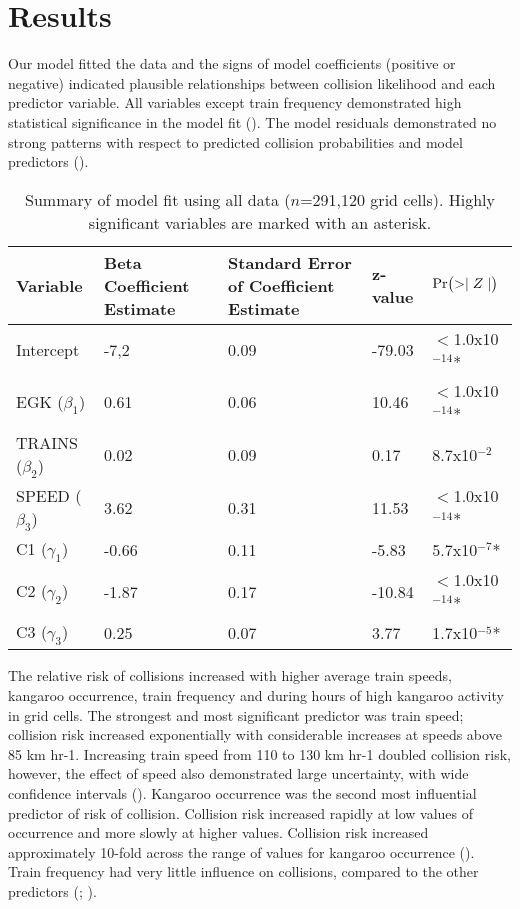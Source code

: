 \section{Results}

Our model fitted the data and the signs of model coefficients (positive or negative) indicated plausible relationships between collision likelihood and each predictor variable.  All variables except train frequency demonstrated high statistical significance in the model fit (). The model residuals demonstrated no strong patterns with respect to predicted collision probabilities and model predictors ().

\begin{table}[htp]
\caption{Summary of model fit using all data ($n$=291,120 grid cells).  Highly significant variables are marked with an asterisk.}
\begin{tabularx}{\textwidth}{lllll} \toprule
Variable			&Beta Coefficient Estimate	&Standard Error of Coefficient Estimate	&z-value &$\text{Pr}\bigl( >\mid Z \mid \bigr)$ \\ \midrule 
Intercept			&-7,2						&0.09	&-79.03 	&$<$1.0x10$^{-14}$* \\ 
EGK	($\beta_1$)		&0.61						&0.06	&10.46		&$<$1.0x10$^{-14}$* \\ 
TRAINS ($\beta_2$)	&0.02						&0.09	&0.17		&8.7x10$^{-2}$ \\ 
SPEED ($\beta_3$)	&3.62						&0.31	&11.53		&$<$1.0x10$^{-14}$* \\ 
C1 ($\gamma_1$)		&-0.66						&0.11 	&-5.83		&5.7x10$^{-7}$* \\
C2 ($\gamma_2$)		&-1.87						&0.17	&-10.84		&$<$1.0x10$^{-14}$* \\
C3 ($\gamma_3$)		&0.25						&0.07	&3.77		&1.7x10$^{-5}$* \\
\bottomrule
\end{tabularx}
\label{train_coefs}
\end{table}

The relative risk of collisions increased with higher average train speeds, kangaroo occurrence, train frequency and during hours of high kangaroo activity in grid cells. The strongest and most significant predictor was train speed; collision risk increased exponentially with considerable increases at speeds above 85 km hr-1.  Increasing train speed from 110 to 130 km hr-1 doubled collision risk, however, the effect of speed also demonstrated large uncertainty, with wide confidence intervals (). Kangaroo occurrence was the second most influential predictor of risk of collision.  Collision risk increased rapidly at low values of occurrence and more slowly at higher values.  Collision risk increased approximately 10-fold across the range of values for kangaroo occurrence (). Train frequency had very little influence on collisions, compared to the other predictors (; ).

